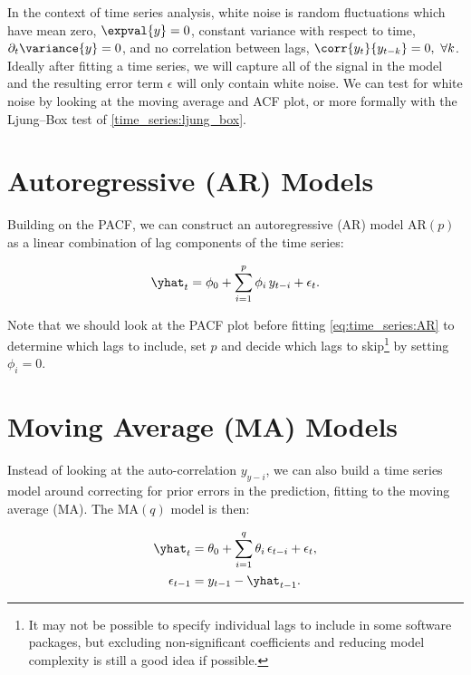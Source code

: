 In the context of time series analysis, white noise is random fluctuations which
have mean zero, $\expval{y} = 0$,
constant variance with respect to time, $\partial_{t} \variance{y} = 0$,
and no correlation between lags, $\corr{y_{t}}{y_{t-k}} = 0,\,\, \forall k$.
Ideally after fitting a time series, we will capture all of the signal
in the model and the resulting error term $\epsilon$ will only contain white noise.
We can test for white noise by looking at the moving average and ACF plot,
or more formally with the Ljung--Box test of \cref{time_series:ljung_box}.

\section{Autoregressive (AR) Models}
\label{time_series:AR}
Building on the PACF, we can construct an autoregressive (AR) model $\text{AR}\left(p\right)$
as a linear combination of lag components of the time series:

\begin{equation}\label{eq:time_series:AR}
\yhat_{t} = \phi_{0} + \sum_{i=1}^{p} \phi_{i}\, y_{t-i} + \epsilon_{t}.
\end{equation}

Note that we should look at the PACF plot before fitting \cref{eq:time_series:AR}
to determine which lags to include,
\ie set $p$ and decide which lags to skip\footnote{It may not be possible
to specify individual lags to include in some software packages,
but excluding non-significant coefficients and reducing model complexity
is still a good idea if possible.} by setting $\phi_{i} = 0$.

\section{Moving Average (MA) Models}
\label{time_series:MA}

Instead of looking at the auto-correlation $y_{y-i}$,
we can also build a time series model around
correcting for prior errors in the prediction,
\ie fitting to the moving average (MA).
The $\text{MA}\left(q\right)$ model
is then:

\begin{subequations}\label{eq:time_series:MA}
\begin{align}
\yhat_{t} &= \theta_{0} + \sum_{i=1}^{q} \theta_{i}\, \epsilon_{t-i} + \epsilon_{t}, \label{eq:time_series:MA_y} \\
\epsilon_{t-1} &= y_{t-1} - \yhat_{t-1}. \label{eq:time_series:MA_epsilon}
\end{align}
\end{subequations}

